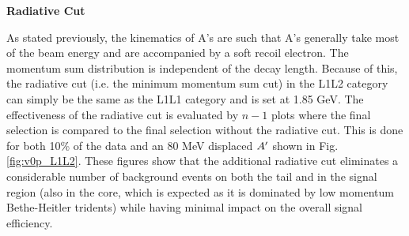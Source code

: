 
\clearpage

\textbf{Radiative Cut}

As stated previously, the kinematics of A's are such that A's generally take most of the beam energy and are accompanied by a soft recoil electron. The momentum sum distribution is independent of the decay length. Because of this, the radiative cut (i.e. the minimum momentum sum cut) in the L1L2 category can simply be the same as the L1L1 category and is set at 1.85 GeV. The effectiveness of the radiative cut is evaluated by $n-1$ plots where the final selection is compared to the final selection without the radiative cut. This is done for both 10\% of the data and an 80 MeV displaced $A^\prime$ shown in Fig. \ref{fig:v0p_L1L2}. These figures show that the additional radiative cut eliminates a considerable number of background events on both the tail and in the signal region (also in the core, which is expected as it is dominated by low momentum Bethe-Heitler tridents) while having minimal impact on the overall signal efficiency. %


